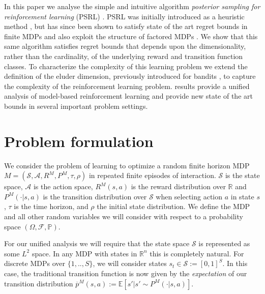 \documentclass{article}
\newcommand{\Exp}{\mathds{E}}
\newcommand{\Real}{\mathds{R}}
\newcommand{\Sc}{\mathcal{S}}
\newcommand{\Ac}{\mathcal{A}}
\begin{document}
In this paper we analyse the simple and intuitive algorithm \emph{posterior sampling for reinforcement learning} (PSRL) \cite{thompson1933,strens2000bayesian,osband2013more}.
PSRL was initially introduced as a heuristic method \cite{strens2000bayesian}, but has since been shown to satisfy state of the art regret bounds in finite MDPs \cite{osband2013more} and also exploit the structure of factored MDPs    \cite{osband2014near}.
We show that this same algorithm satisfies regret bounds that depends upon the dimensionality, rather than the cardinality, of the underlying reward and transition function classes.
To characterize the complexity of this learning problem we extend the definition of the eluder dimension, previously introduced for bandits \cite{russo2013eluder}, to capture the complexity of the reinforcement learning problem.
results provide a unified analysis of model-based reinforcement learning and provide new state of the art bounds in several important problem settings.


\section{Problem formulation}

We consider the problem of learning to optimize a random finite horizon MDP $M = (\Sc, \Ac, R^M, P^M, \tau, \rho)$ in repeated finite episodes of interaction.
$\Sc$ is the state space, $\Ac$ is the action space, $R^M(s,a)$ is the reward distribution over $\Real$ and $P^M(\cdot|s,a)$ is the transition distribution over $\Sc$ when selecting action $a$ in state $s$, $\tau$ is the time horizon, and $\rho$ the initial state distribution.
We define the MDP and all other random variables we will consider with respect to a probability space $(\Omega, \mathscr{F}, \mathbb{P})$.

For our unified analysis we will require that the state space $\Sc$ is represented as some $L^2$ space.
In any MDP with states in $\Real^n$ this is completely natural.
For discrete MDPs over $\{1,..,S\}$, we will consider states $s_t \in \Sc := [0,1]^S$.
In this case, the traditional transition function is now given by the \emph{expectation} of our transition distribution $\overline{p}^M(s,a) := \Exp \left[s' | s' \sim P^M(\cdot|s,a)\right]$.
\end{document}
